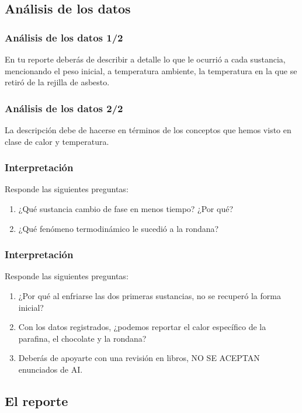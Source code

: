 \documentclass[14pt]{beamer}
\begin{document}
\subsection{Análisis de los datos}

\begin{frame}
\frametitle{Análisis de los datos 1/2}
En tu reporte deberás de describir a detalle lo que le ocurrió a cada sustancia, mencionando el peso inicial, a temperatura ambiente, la temperatura en la que se retiró de la rejilla de asbesto.
\end{frame}
\begin{frame}
\frametitle{Análisis de los datos 2/2}
La descripción debe de hacerse en términos de los conceptos que hemos visto en clase de calor y temperatura.
\end{frame}
\begin{frame}
\frametitle{Interpretación}
Responde las siguientes preguntas:
\pause
{}
\begin{enumerate}[<+->]
\item ¿Qué sustancia cambio de fase en menos tiempo? ¿Por qué?
\item ¿Qué fenómeno termodinámico le sucedió a la rondana?
\seti
\end{enumerate}
\end{frame}
\begin{frame}
\frametitle{Interpretación}
Responde las siguientes preguntas:
\pause
{}
\begin{enumerate}[<+->]
\conti
\item ¿Por qué al enfriarse las dos primeras sustancias, no se recuperó la forma inicial?
\item Con los datos registrados, ¿podemos reportar el calor específico de la parafina, el chocolate y la rondana?
\item Deberás de apoyarte con una revisión en libros, NO SE ACEPTAN enunciados de AI.
\end{enumerate}
\end{frame}


\subsection{El reporte}
\end{document}

